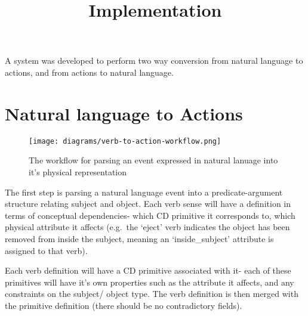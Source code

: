 \documentclass{article}
\title{Implementation}
\begin{document}
    \maketitle

    A system was developed to perform two way conversion from natural language to actions, and from actions to natural language.

    \section{Natural language to Actions}
    \begin{figure}
        \begin{center}        
            \texttt{[image: diagrams/verb-to-action-workflow.png]}
        \end{center}
        \caption{The workflow for parsing an event expressed in natural lanuage into it's physical representation}
    \end{figure}

    The first step is parsing a natural language event into a predicate-argument structure relating subject and object. Each verb sense will have a definition in terms of conceptual dependencies- which CD primitive it corresponds to, which physical attribute it affects (e.g.~the `eject' verb indicates the object has been removed from inside the subject, meaning an `inside\_subject' attribute is assigned to that verb).

    Each verb definition will have a CD primitive associated with it- each of these primitives will have it's own properties such as the attribute it affects, and any constraints on the subject/ object type. The verb definition is then merged with the primitive definition (there should be no contradictory fields).
    
    
\end{document}
